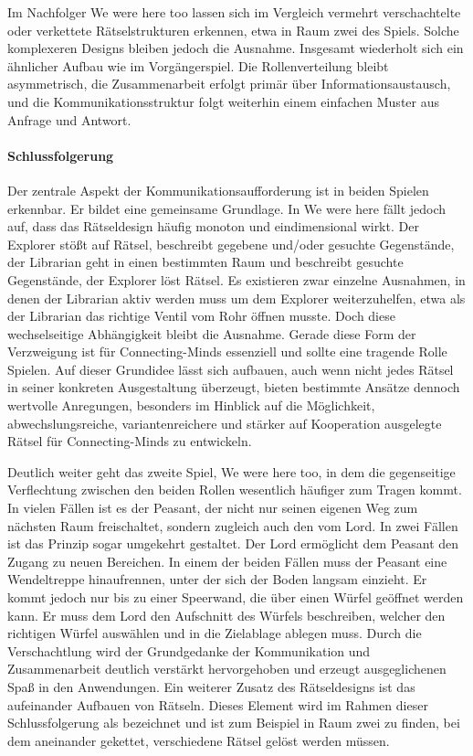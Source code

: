 Im Nachfolger We were here too lassen sich im Vergleich vermehrt verschachtelte oder verkettete Rätselstrukturen erkennen, etwa in Raum zwei des Spiels. Solche komplexeren Designs bleiben jedoch die Ausnahme. Insgesamt wiederholt sich ein ähnlicher Aufbau wie im Vorgängerspiel. Die Rollenverteilung bleibt asymmetrisch, die Zusammenarbeit erfolgt primär über Informationsaustausch, und die Kommunikationsstruktur folgt weiterhin einem einfachen Muster aus Anfrage und Antwort.

\paragraph{Schlussfolgerung}
Der zentrale Aspekt der Kommunikationsaufforderung ist in beiden Spielen erkennbar. Er bildet eine gemeinsame Grundlage. In We were here fällt jedoch auf, dass das Rätseldesign häufig monoton und eindimensional wirkt. Der Explorer stößt auf Rätsel, beschreibt gegebene und/oder gesuchte Gegenstände, der Librarian geht in einen bestimmten Raum und beschreibt gesuchte Gegenstände, der Explorer löst Rätsel. Es existieren zwar einzelne Ausnahmen, in denen der Librarian aktiv werden muss um dem Explorer weiterzuhelfen, etwa als der Librarian das richtige Ventil vom Rohr öffnen musste. Doch diese wechselseitige Abhängigkeit bleibt die Ausnahme. Gerade diese Form der Verzweigung ist für Connecting-Minds essenziell und sollte eine tragende Rolle Spielen. Auf dieser Grundidee lässt sich aufbauen, auch wenn nicht jedes Rätsel in seiner konkreten Ausgestaltung überzeugt, bieten bestimmte Ansätze dennoch wertvolle Anregungen, besonders im Hinblick auf die Möglichkeit, abwechslungsreiche, variantenreichere und stärker auf Kooperation ausgelegte Rätsel für Connecting-Minds zu entwickeln.

Deutlich weiter geht das zweite Spiel, We were here too, in dem die gegenseitige Verflechtung zwischen den beiden Rollen wesentlich häufiger zum Tragen kommt. In vielen Fällen ist es der Peasant, der nicht nur seinen eigenen Weg zum nächsten Raum freischaltet, sondern zugleich auch den vom Lord. In zwei Fällen ist das Prinzip sogar umgekehrt gestaltet. Der Lord ermöglicht dem Peasant den Zugang zu neuen Bereichen. In einem der beiden Fällen muss der Peasant eine Wendeltreppe hinaufrennen, unter der sich der Boden langsam einzieht. Er kommt jedoch nur bis zu einer Speerwand, die über einen Würfel geöffnet werden kann. Er muss dem Lord den Aufschnitt des Würfels beschreiben, welcher den richtigen Würfel auswählen und in die Zielablage ablegen muss. Durch die Verschachtlung wird der Grundgedanke der Kommunikation und Zusammenarbeit deutlich verstärkt hervorgehoben und erzeugt ausgeglichenen Spaß in den Anwendungen. Ein weiterer Zusatz des Rätseldesigns ist das aufeinander Aufbauen von Rätseln. Dieses Element wird im Rahmen dieser Schlussfolgerung als  bezeichnet und ist zum Beispiel in Raum zwei zu finden, bei dem aneinander gekettet, verschiedene Rätsel gelöst werden müssen.


